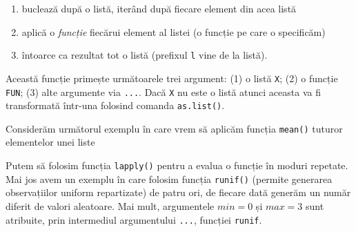 \documentclass[]{article}
\newenvironment{Shaded}{\begin{snugshade}}{\end{snugshade}}
\newcommand{\DataTypeTok}[1]{\textcolor[rgb]{0.13,0.29,0.53}{#1}}
\newcommand{\DecValTok}[1]{\textcolor[rgb]{0.00,0.00,0.81}{#1}}
\newcommand{\FloatTok}[1]{\textcolor[rgb]{0.00,0.00,0.81}{#1}}
\newcommand{\KeywordTok}[1]{\textcolor[rgb]{0.13,0.29,0.53}{\textbf{#1}}}
\newcommand{\NormalTok}[1]{#1}
\newcommand{\OperatorTok}[1]{\textcolor[rgb]{0.81,0.36,0.00}{\textbf{#1}}}
\newcommand{\StringTok}[1]{\textcolor[rgb]{0.31,0.60,0.02}{#1}}
\providecommand{\tightlist}{%
  \setlength{\itemsep}{0pt}\setlength{\parskip}{0pt}}
\begin{document}
\begin{enumerate}
\def\labelenumi{\arabic{enumi}.}
\tightlist
\item
  buclează după o listă, iterând după fiecare element din acea listă
\item
  aplică o \emph{funcție} fiecărui element al listei (o funcție pe care
  o specificăm)
\item
  întoarce ca rezultat tot o listă (prefixul \texttt{l} vine de la
  listă).
\end{enumerate}

Această funcție primește următoarele trei argument: (1) o listă
\texttt{X}; (2) o funcție \texttt{FUN}; (3) alte argumente via
\texttt{...}. Dacă \texttt{X} nu este o listă atunci aceasta va fi
transformată într-una folosind comanda \texttt{as.list()}.

Considerăm următorul exemplu în care vrem să aplicăm funcția
\texttt{mean()} tuturor elementelor unei liste

\begin{Shaded}
\end{Shaded}

Putem să folosim funcția \texttt{lapply()} pentru a evalua o funcție în
moduri repetate. Mai jos avem un exemplu în care folosim funcția
\texttt{runif()} (permite generarea observațiilor uniform repartizate)
de patru ori, de fiecare dată generăm un număr diferit de valori
aleatoare. Mai mult, argumentele \(min=0\) și \(max=3\) sunt atribuite,
prin intermediul argumentului \texttt{...}, funcției \texttt{runif}.
\end{document}
